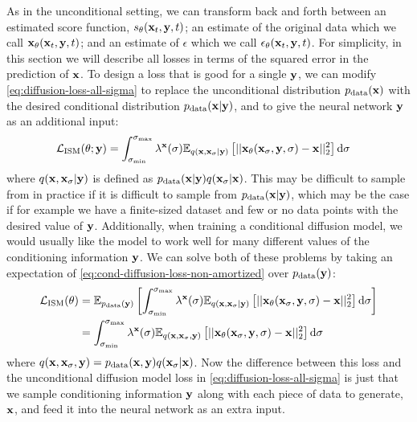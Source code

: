 As in the unconditional setting, we can transform back and forth between an estimated score function, $s_\theta({\mathbf{x}}_t, {\mathbf{y}}, t)$; an estimate of the original data which we call ${\mathbf{x}}_\theta({\mathbf{x}}_t, {\mathbf{y}}, t)$; and an estimate of $\epsilon$ which we call $\mathbf{\epsilon}_\theta({\mathbf{x}}_t, {\mathbf{y}}, t)$. For simplicity, in this section we will describe all losses in terms of the squared error in the prediction of ${\mathbf{x}}$. To design a loss that is good for a single ${\mathbf{y}}$, we can modify \cref{eq:diffusion-loss-all-sigma} to replace the unconditional distribution $p_{\rm{data}}({\mathbf{x}})$ with the desired conditional distribution $p_{\rm{data}}({\mathbf{x}}|{\mathbf{y}})$, and to give the neural network ${\mathbf{y}}$ as an additional input:
\begin{align} \label{eq:cond-diffusion-loss-non-amortized}
    \mathcal{L}_\text{ISM}(\theta; {\mathbf{y}}) &= \int_{\sigma_\text{min}}^{\sigma_\text{max}} \lambda^{\mathbf{x}}(\sigma) \mathbb{E}_{q({\mathbf{x}}, {\mathbf{x}}_\sigma|{\mathbf{y}})} \left[ 
    || {\mathbf{x}}_\theta({\mathbf{x}}_\sigma, {\mathbf{y}}, \sigma) - {\mathbf{x}} ||_2^2 \right] \mathrm{d}\sigma
\end{align}
where $q({\mathbf{x}}, {\mathbf{x}}_\sigma|{\mathbf{y}})$ is defined as $p_{\rm{data}}({\mathbf{x}}|{\mathbf{y}}) q({\mathbf{x}}_\sigma|{\mathbf{x}})$. This may be difficult to sample from in practice if it is difficult to sample from $p_{\rm{data}}({\mathbf{x}}|{\mathbf{y}})$, which may be the case if for example we have a finite-sized dataset and few or no data points with the desired value of ${\mathbf{y}}$. Additionally, when training a conditional diffusion model, we would usually like the model to work well for many different values of the conditioning information ${\mathbf{y}}$. We can solve both of these problems by taking an expectation of \cref{eq:cond-diffusion-loss-non-amortized} over $p_{\rm{data}}({\mathbf{y}})$:
\begin{align} \label{eq:cond-diffusion-loss}
    \mathcal{L}_\text{ISM}(\theta) &= \mathbb{E}_{p_{\rm{data}}({\mathbf{y}})} \left[ \int_{\sigma_\text{min}}^{\sigma_\text{max}} \lambda^{\mathbf{x}}(\sigma) \mathbb{E}_{q({\mathbf{x}}, {\mathbf{x}}_\sigma|{\mathbf{y}})} \left[ 
    || {\mathbf{x}}_\theta({\mathbf{x}}_\sigma, {\mathbf{y}}, \sigma) - {\mathbf{x}} ||_2^2 \right] \mathrm{d}\sigma \right] \\
    &= \int_{\sigma_\text{min}}^{\sigma_\text{max}} \lambda^{\mathbf{x}}(\sigma) \mathbb{E}_{q({\mathbf{x}}, {\mathbf{x}}_\sigma,{\mathbf{y}})} \left[ 
    || {\mathbf{x}}_\theta({\mathbf{x}}_\sigma, {\mathbf{y}}, \sigma) - {\mathbf{x}} ||_2^2 \right] \mathrm{d}\sigma 
\end{align}
where $q({\mathbf{x}}, {\mathbf{x}}_\sigma,{\mathbf{y}}) = p_{\rm{data}}({\mathbf{x}},{\mathbf{y}})q({\mathbf{x}}_\sigma|{\mathbf{x}})$. Now the difference between this loss and the unconditional diffusion model loss in \cref{eq:diffusion-loss-all-sigma} is just that we sample conditioning information ${\mathbf{y}}$ along with each piece of data to generate, ${\mathbf{x}}$, and feed it into the neural network as an extra input.

